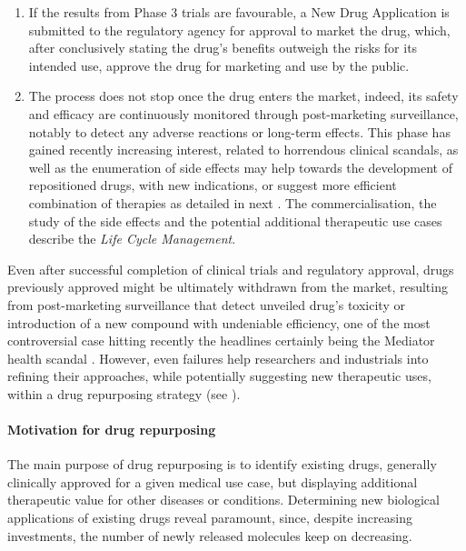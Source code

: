 \begin{enumerate}
\item If the results from Phase 3 trials are favourable, a New Drug Application is submitted to the regulatory agency for approval to market the drug, which, after conclusively stating the drug's benefits outweigh the risks for its intended use, approve the drug for marketing and use by the public.

\item The process does not stop once the drug enters the market, indeed, its safety and efficacy are continuously monitored through post-marketing surveillance, notably to detect any adverse reactions or long-term effects. This phase has gained recently increasing interest, related to horrendous clinical scandals, as well as the enumeration of side effects may help towards the development of repositioned drugs, with new indications, or suggest more efficient combination of therapies as detailed in next . The commercialisation, the study of the side effects and the potential additional therapeutic use cases describe the \emph{Life Cycle Management}.

\end{enumerate}

Even after successful completion of clinical trials and regulatory approval, drugs previously approved might be ultimately withdrawn from the market, resulting from post-marketing surveillance that detect unveiled drug's toxicity or introduction of a new compound with undeniable efficiency, one of the most controversial case hitting recently the headlines certainly being the Mediator health scandal \autocite{Mediator21}. However, even failures help researchers and industrials into refining their approaches, while potentially suggesting new  therapeutic uses, within a drug repurposing strategy (see ).

\paragraph{Motivation for drug repurposing}
\label{para:drug-repurposing-motivation}

The main purpose of drug repurposing is to identify existing drugs, generally clinically approved for a given medical use case, but displaying additional therapeutic value for other diseases or conditions. Determining new biological applications of existing drugs reveal paramount, since, despite increasing investments, the number of newly released molecules keep on decreasing.

